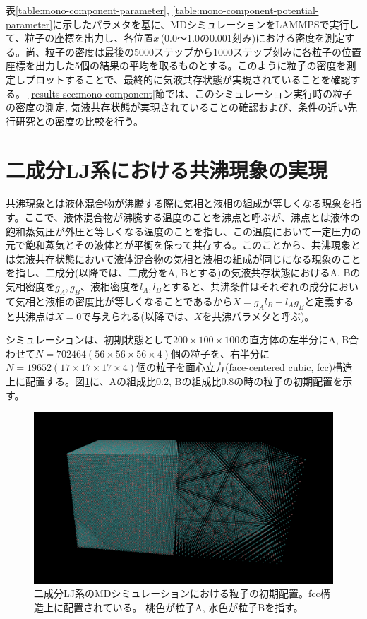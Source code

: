 \documentclass[titlepage]{jsreport}
\begin{document}
表\ref{table:mono-component-parameter}, \ref{table:mono-component-potential-parameter}に示したパラメタを基に、MDシミュレーションをLAMMPSで実行して、粒子の座標を出力し、各位置$x$\,(0.0〜1.0の0.001刻み)における密度を測定する。尚、粒子の密度は最後の5000ステップから1000ステップ刻みに各粒子の位置座標を出力した5個の結果の平均を取るものとする。このように粒子の密度を測定しプロットすることで、最終的に気液共存状態が実現されていることを確認する。
\ref{results-sec:mono-component}節では、このシミュレーション実行時の粒子の密度の測定, 気液共存状態が実現されていることの確認および、条件の近い先行研究との密度の比較を行う。


\section{二成分LJ系における共沸現象の実現} \label{method-sec:bi-component-azeotrope}
共沸現象とは液体混合物が沸騰する際に気相と液相の組成が等しくなる現象を指す。ここで、液体混合物が沸騰する温度のことを沸点と呼ぶが、沸点とは液体の飽和蒸気圧が外圧と等しくなる温度のことを指し\cite{atkins}、この温度において一定圧力の元で飽和蒸気とその液体とが平衡を保って共存する。このことから、共沸現象とは気液共存状態において液体混合物の気相と液相の組成が同じになる現象のことを指し、二成分(以降では、二成分をA, Bとする)の気液共存状態におけるA, Bの気相密度を$g_A, g_B$、液相密度を$l_A, l_B$とすると、共沸条件はそれぞれの成分において気相と液相の密度比が等しくなることであるから$X=g_Al_B-l_Ag_B$と定義すると共沸点は$X=0$で与えられる(以降では、$X$を共沸パラメタと呼ぶ)。

シミュレーションは、初期状態として$200×100×100$の直方体の左半分にA, B合わせて$N=702464(56×56×56×4)$個の粒子を、右半分に$N=19652(17×17×17×4)$個の粒子を面心立方(face-centered cubic, fcc)構造上に配置する。図\ref{fig:lan140493-lbn561971-ran3930-rbn15722-first}に、Aの組成比0.2, Bの組成比0.8の時の粒子の初期配置を示す。

\begin{figure}[htbp]
    \begin{center}
        \includegraphics[width=14cm]{fig/lan140493-lbn561971-ran3930-rbn15722/lan140493-lbn561971-ran3930-rbn15722-first.png}
    \end{center}
    \caption{二成分LJ系のMDシミュレーションにおける粒子の初期配置。fcc構造上に配置されている。
    桃色が粒子A, 水色が粒子Bを指す。}
    \label{fig:lan140493-lbn561971-ran3930-rbn15722-first}
\end{figure}
\end{document}
